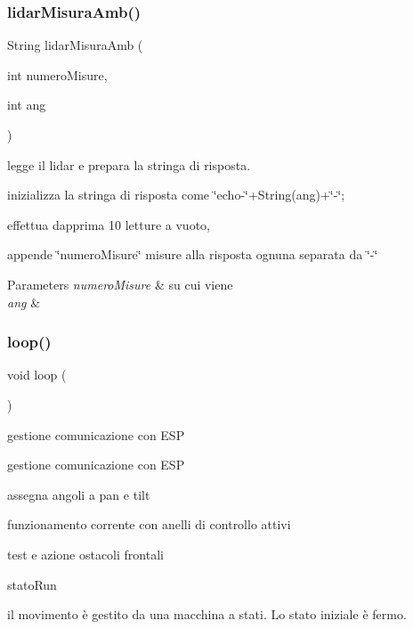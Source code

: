 \subsubsection{\texorpdfstring{lidar\+Misura\+Amb()}{lidarMisuraAmb()}}
{\footnotesize\ttfamily String lidar\+Misura\+Amb (\begin{DoxyParamCaption}\item[{int}]{numero\+Misure,  }\item[{int}]{ang }\end{DoxyParamCaption})}



legge il lidar e prepara la stringa di risposta. 

inizializza la stringa di risposta come \char`\"{}echo-\/\char`\"{}+\+String(ang)+\char`\"{}-\/\char`\"{};

effettua dapprima 10 letture a vuoto,

appende \char`\"{}numero\+Misure\char`\"{} misure alla risposta ognuna separata da \char`\"{}-\/\char`\"{}


\begin{DoxyParams}{Parameters}
{\em numero\+Misure} & su cui viene \\
\hline
{\em ang} & \\
\hline
\end{DoxyParams}
\mbox{\label{ari_pi__2_d_c__esp__08_8ino_afe461d27b9c48d5921c00d521181f12f}} 
\subsubsection{\texorpdfstring{loop()}{loop()}}
{\footnotesize\ttfamily void loop (\begin{DoxyParamCaption}{ }\end{DoxyParamCaption})}

gestione comunicazione con E\+SP

gestione comunicazione con E\+SP

assegna angoli a pan e tilt

funzionamento corrente con anelli di controllo attivi

test e azione ostacoli frontali

stato\+Run

il movimento è gestito da una macchina a stati. Lo stato iniziale è fermo.

